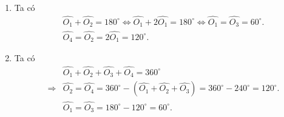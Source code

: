 \begin{vn}
{\begin{enumerate}
\begin{align*}
				\end{align*}
			\item Ta có 
				\begin{align*}
					&\widehat{O_1} + \widehat{O_2} = 180^\circ \Leftrightarrow \widehat{O_1} + 2\widehat{O_1} = 180^\circ \Leftrightarrow \widehat{O_1} = \widehat{O_3} = 60^\circ.\\
					&\widehat{O_4} = \widehat{O_2} = 2\widehat{O_1} = 120^\circ.
				\end{align*}
			\item Ta có 
				\begin{eqnarray*}
					&&\widehat{O_1} + \widehat{O_2} + \widehat{O_3} + \widehat{O_4} = 360^\circ \\
					&\Rightarrow& \widehat{O_2} = \widehat{O_4} = 360^\circ - \left(\widehat{O_1} + \widehat{O_2} + \widehat{O_3}\right) = 360^\circ - 240^\circ = 120^\circ.\\
					&&\widehat{O_1} = \widehat{O_3} = 180^\circ - 120^\circ = 60^\circ.
				\end{eqnarray*}
			 
		\end{enumerate}
	}
\end{vn}

